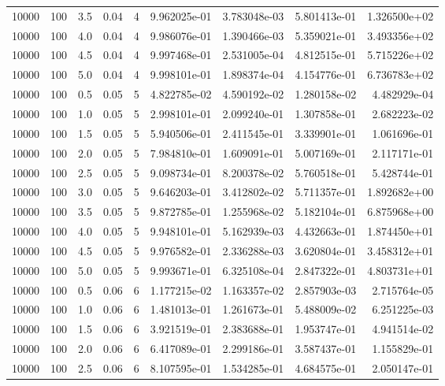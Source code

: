 \begin{tabular}{rrrrrrrrr}
 10000 &  100 &  3.5 &  0.04 &     4 &  9.962025e-01 &  3.783048e-03 &  5.801413e-01 &  1.326500e+02 \\
 10000 &  100 &  4.0 &  0.04 &     4 &  9.986076e-01 &  1.390466e-03 &  5.359021e-01 &  3.493356e+02 \\
 10000 &  100 &  4.5 &  0.04 &     4 &  9.997468e-01 &  2.531005e-04 &  4.812515e-01 &  5.715226e+02 \\
 10000 &  100 &  5.0 &  0.04 &     4 &  9.998101e-01 &  1.898374e-04 &  4.154776e-01 &  6.736783e+02 \\
 10000 &  100 &  0.5 &  0.05 &     5 &  4.822785e-02 &  4.590192e-02 &  1.280158e-02 &  4.482929e-04 \\
 10000 &  100 &  1.0 &  0.05 &     5 &  2.998101e-01 &  2.099240e-01 &  1.307858e-01 &  2.682223e-02 \\
 10000 &  100 &  1.5 &  0.05 &     5 &  5.940506e-01 &  2.411545e-01 &  3.339901e-01 &  1.061696e-01 \\
 10000 &  100 &  2.0 &  0.05 &     5 &  7.984810e-01 &  1.609091e-01 &  5.007169e-01 &  2.117171e-01 \\
 10000 &  100 &  2.5 &  0.05 &     5 &  9.098734e-01 &  8.200378e-02 &  5.760518e-01 &  5.428744e-01 \\
 10000 &  100 &  3.0 &  0.05 &     5 &  9.646203e-01 &  3.412802e-02 &  5.711357e-01 &  1.892682e+00 \\
 10000 &  100 &  3.5 &  0.05 &     5 &  9.872785e-01 &  1.255968e-02 &  5.182104e-01 &  6.875968e+00 \\
 10000 &  100 &  4.0 &  0.05 &     5 &  9.948101e-01 &  5.162939e-03 &  4.432663e-01 &  1.874450e+01 \\
 10000 &  100 &  4.5 &  0.05 &     5 &  9.976582e-01 &  2.336288e-03 &  3.620804e-01 &  3.458312e+01 \\
 10000 &  100 &  5.0 &  0.05 &     5 &  9.993671e-01 &  6.325108e-04 &  2.847322e-01 &  4.803731e+01 \\
 10000 &  100 &  0.5 &  0.06 &     6 &  1.177215e-02 &  1.163357e-02 &  2.857903e-03 &  2.715764e-05 \\
 10000 &  100 &  1.0 &  0.06 &     6 &  1.481013e-01 &  1.261673e-01 &  5.488009e-02 &  6.251225e-03 \\
 10000 &  100 &  1.5 &  0.06 &     6 &  3.921519e-01 &  2.383688e-01 &  1.953747e-01 &  4.941514e-02 \\
 10000 &  100 &  2.0 &  0.06 &     6 &  6.417089e-01 &  2.299186e-01 &  3.587437e-01 &  1.155829e-01 \\
 10000 &  100 &  2.5 &  0.06 &     6 &  8.107595e-01 &  1.534285e-01 &  4.684575e-01 &  2.050147e-01 \\

\end{tabular}
